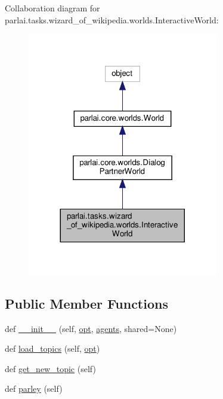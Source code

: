 Collaboration diagram for parlai.\+tasks.\+wizard\+\_\+of\+\_\+wikipedia.\+worlds.\+Interactive\+World\+:
\nopagebreak
\begin{figure}[H]
\begin{center}
\leavevmode
\includegraphics[width=236pt]{classparlai_1_1tasks_1_1wizard__of__wikipedia_1_1worlds_1_1InteractiveWorld__coll__graph}
\end{center}
\end{figure}
\subsection*{Public Member Functions}
\begin{DoxyCompactItemize}
\item 
def \hyperlink{classparlai_1_1tasks_1_1wizard__of__wikipedia_1_1worlds_1_1InteractiveWorld_a17330f1fd256bd53eafea1c7e119d77d}{\+\_\+\+\_\+init\+\_\+\+\_\+} (self, \hyperlink{classparlai_1_1core_1_1worlds_1_1World_a3640d92718acd3e6942a28c1ab3678bd}{opt}, \hyperlink{classparlai_1_1core_1_1worlds_1_1DialogPartnerWorld_a04185d1d55ca86c96c796f12f2226fc9}{agents}, shared=None)
\item 
def \hyperlink{classparlai_1_1tasks_1_1wizard__of__wikipedia_1_1worlds_1_1InteractiveWorld_af4efe25e565dbf73a46d1559eb425243}{load\+\_\+topics} (self, \hyperlink{classparlai_1_1core_1_1worlds_1_1World_a3640d92718acd3e6942a28c1ab3678bd}{opt})
\item 
def \hyperlink{classparlai_1_1tasks_1_1wizard__of__wikipedia_1_1worlds_1_1InteractiveWorld_a01cde3e1317b31cf52024283f061fdf6}{get\+\_\+new\+\_\+topic} (self)
\item 
def \hyperlink{classparlai_1_1tasks_1_1wizard__of__wikipedia_1_1worlds_1_1InteractiveWorld_afcda29202fc3fd773522edbd3c40e4a4}{parley} (self)
\end{DoxyCompactItemize}
